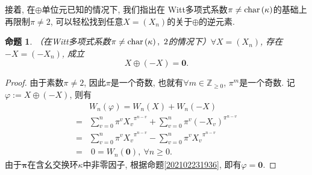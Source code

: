 \documentclass[UTF8, twoside]{ctexart}
\theoremstyle{nonumberplain}
\newtheorem{proof}{\heiti 证明}  %
\theoremstyle{nonumberplain}
\theoremstyle{plain}
\newtheorem{mingti4}[dingyi4]{命题}
\begin{document}
	接着, 在$\oplus$单位元已知的情况下, 我们指出在
	Witt多项式系数$\pi \ne \textup{char}\left( \kappa  \right)$的基础上再限制$\pi \ne 2$, 可以轻松找到任意$X=\left( {{X}_{n}} \right)$的关于$\oplus $的逆元素. 
	\begin{mingti4} \label{Witt运算可逆性}
		（在Witt多项式系数$\pi \ne \textup{char}\left( \kappa  \right),\ 2$的情况下）$\forall X=\left( {{X}_{n}} \right)$, 存在$-X=\left( -{{X}_{n}} \right)$, 成立
		\[
			X\oplus \left( -X \right)=\bm{0}.
		\]
	\end{mingti4}
	\begin{proof}
		由于素数$\pi \ne 2$, 因此$\pi $是一个奇数, 也就有$\forall m\in {{\mathbb{Z}}_{\ge 0}}$, ${{\pi }^{m}}$是一个奇数. 记$\varphi :=X\oplus \left( -X \right)$, 则有
		\begin{align*}
			& {{W}_{n}}\left( \varphi  \right)={{W}_{n}}\left( X \right)+{{W}_{n}}\left( -X \right) \\ 
			=&\sum\limits_{v=0}^{n}{{{\pi }^{v}}{{X}_{v}}^{{{\pi }^{n-v}}}}+\sum\limits_{v=0}^{n}{{{\pi }^{v}}{{\left( -{{X}_{v}} \right)}^{{{\pi }^{n-v}}}}} \\ 
			=&\sum\limits_{v=0}^{n}{{{\pi }^{v}}{{X}_{v}}^{{{\pi }^{n-v}}}}-\sum\limits_{v=0}^{n}{{{\pi }^{v}}{{X}_{v}}^{{{\pi }^{n-v}}}} \\ 
			=&\ 0={{W}_{n}}\left( \bm{0} \right),
			\ \forall n\ge 0. 
		\end{align*}
		由于$\bm{\pi}$在含幺交换环$\kappa $中非零因子, 根据命题\ref{202102231936}, 即有$\varphi = \bm{0}$.
	\end{proof}
	\vskip 0.5cm
	
\end{document}
